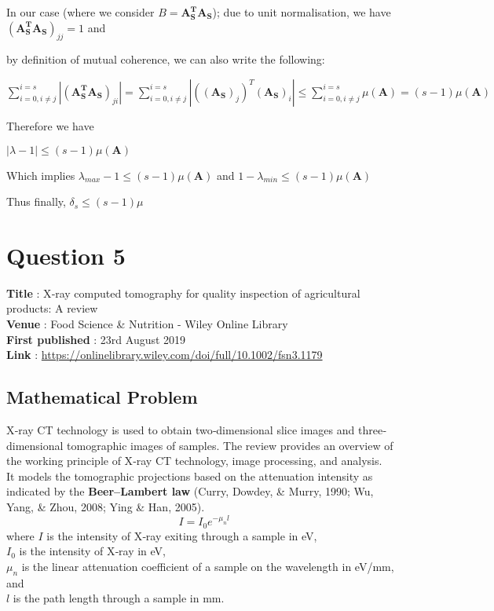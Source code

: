 \documentclass[fleqn, 11pt]{article}
\newcommand{\bs}[1]{\boldsymbol{#1}}
\begin{document}
\medskip 

In our case (where we consider $B=\bs{A_S^TA_S}$); due to unit normalisation, we have $(\bs{A_S^TA_S})_{jj}=1$ and  

by definition of mutual coherence, we can also write the following: 

$\displaystyle \sum_{i=0, i \neq j}^{i=s} |(\bs{A_S^TA_S})_{ji} | 
= \sum_{i=0, i \neq j}^{i=s} |((\bs{A_S})_j)^T (\bs{A_S})_{i} |  
\leq \sum_{i=0, i \neq j}^{i=s} \mu(\bs{A}) 
= (s-1) \mu(\bs{A})   $

\medskip 

Therefore we have 

$|\lambda-1|  \leq  (s-1) \mu(\bs{A})  $

\medskip 

Which implies $\lambda_{max} -1  \leq  (s-1) \mu(\bs{A})  $ and $1-\lambda_{min}  \leq  (s-1) \mu(\bs{A})  $ 

\medskip 

Thus finally,
$\delta_s \leq (s-1) \mu $ 



\newpage
\section*{Question 5}
\setcounter{equation}{0}

\textbf{Title} : X‐ray computed tomography for quality inspection of agricultural products: A review \\
\textbf{Venue} : Food Science \& Nutrition - Wiley Online Library \\
\textbf{First published} : 23rd August 2019 \\
\textbf{Link} : \url{https://onlinelibrary.wiley.com/doi/full/10.1002/fsn3.1179}

\subsection*{Mathematical Problem}
X‐ray CT technology is used to obtain two‐dimensional slice images and three‐dimensional tomographic images of samples. The review provides an overview of the working principle of X‐ray CT technology, image processing, and analysis. \\

It models the tomographic projections based on the attenuation intensity as indicated by the \textbf{Beer–Lambert law} (Curry, Dowdey, \& Murry, 1990; Wu, Yang, \& Zhou, 2008; Ying \& Han, 2005).
$$I = I_0 e^{-\mu_n l}$$
where $I$ is the intensity of X‐ray exiting through a sample in eV,\\
$I_0$ is the intensity of X‐ray in eV,\\
$\mu_n$ is the linear attenuation coefficient of a sample on the wavelength in eV/mm, and\\
$l$ is the path length through a sample in mm. \\
\end{document}
